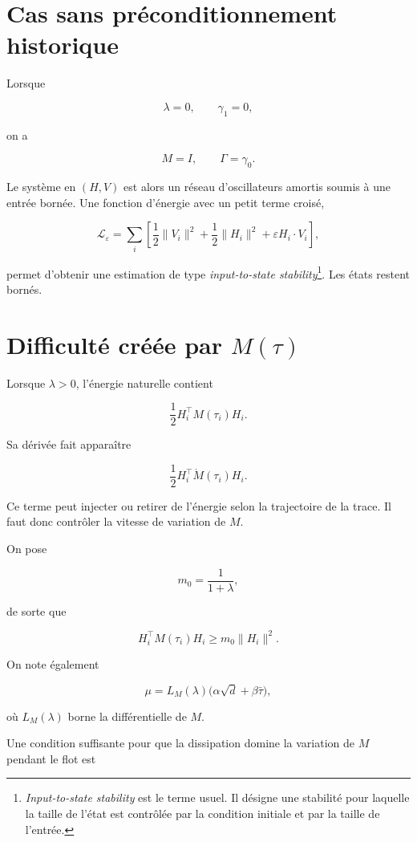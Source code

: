 \section{Cas sans préconditionnement historique}\label{t1-cas-sans-preconditionnement-historique}

Lorsque

\[
\lambda=0,
\qquad
\gamma_1=0,
\]

on a

\[
M=I,
\qquad
\Gamma=\gamma_0.
\]

Le système en \((H,V)\) est alors un réseau d'oscillateurs amortis soumis à une entrée bornée. Une fonction d'énergie avec un petit terme croisé,

\[
\mathcal L_\varepsilon
=
\sum_i
\left[
\frac12\|V_i\|^2
+
\frac12\|H_i\|^2
+
\varepsilon H_i\cdot V_i
\right],
\]

permet d'obtenir une estimation de type \emph{input-to-state stability}\footnote{\emph{Input-to-state stability} est le terme usuel. Il désigne une stabilité pour laquelle la taille de l'état est contrôlée par la condition initiale et par la taille de l'entrée.}\cite{sontag1989smooth}. Les états restent bornés.

\section{Difficulté créée par \texorpdfstring{\(M(\tau)\)}{M(tau)}}\label{t1-difficulte-creee-par-mtau}

Lorsque \(\lambda>0\), l'énergie naturelle contient

\[
\frac12 H_i^\top M(\tau_i)H_i.
\]

Sa dérivée fait apparaître

\[
\frac12 H_i^\top \dot M(\tau_i)H_i.
\]

Ce terme peut injecter ou retirer de l'énergie selon la trajectoire de la trace. Il faut donc contrôler la vitesse de variation de \(M\).

On pose

\[
m_0=\frac{1}{1+\lambda},
\]

de sorte que

\[
H_i^\top M(\tau_i)H_i
\geq
m_0\|H_i\|^2.
\]

On note également

\[
\mu
=
L_M(\lambda)
\bigl(\alpha\sqrt d+\beta\bar\tau\bigr),
\]

où \(L_M(\lambda)\) borne la différentielle de \(M\).

Une condition suffisante pour que la dissipation domine la variation de \(M\) pendant le flot est

